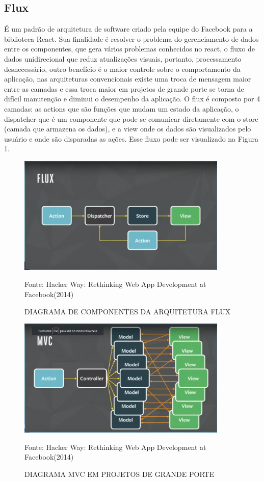\documentclass{ufersa}
\begin{document}
\subsection{Flux}

É um padrão de arquitetura de software criado pela equipe do Facebook para a biblioteca React. Sua finalidade é resolver o problema do gerenciamento de dados entre os componentes, que gera vários problemas conhecidos no react, o fluxo de dados unidirecional que reduz atualizações visuais, portanto, processamento desnecessário, outro benefício é o maior controle sobre o comportamento da aplicação, nas arquiteturas convencionais existe uma troca de mensagem maior entre as camadas e essa troca maior em projetos de grande porte se torna de difícil manutenção e diminui o desempenho da aplicação.
O flux é composto por 4 camadas: as actions que são funções que mudam um estado da aplicação, o dispatcher que é um componente que pode se comunicar diretamente com o store (camada que armazena os dados), e a view onde os dados são visualizados pelo usuário e onde são disparadas as ações. Esse fluxo pode ser visualizado na Figura 1. 


\begin{figure}[h]
\centering 
\caption{DIAGRAMA DE COMPONENTES DA ARQUITETURA FLUX}

\setlength{\unitlength}{1mm}
\includegraphics[width=10cm]{assets/flux.png} 

Fonte: Hacker Way: Rethinking Web App Development at Facebook(2014)

\end{figure}


\begin{figure}[htb]
\centering 
\caption{DIAGRAMA MVC EM PROJETOS DE GRANDE PORTE}
\setlength{\unitlength}{1mm}
\includegraphics[width=10cm]{assets/mvc.png} 

Fonte: Hacker Way: Rethinking Web App Development at Facebook(2014)
\end{figure}
\end{document}
